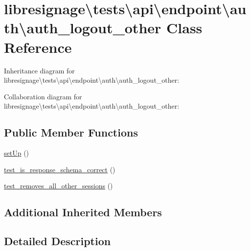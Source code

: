 \hypertarget{classlibresignage_1_1tests_1_1api_1_1endpoint_1_1auth_1_1auth__logout__other}{}\section{libresignage\textbackslash{}tests\textbackslash{}api\textbackslash{}endpoint\textbackslash{}auth\textbackslash{}auth\+\_\+logout\+\_\+other Class Reference}
\label{classlibresignage_1_1tests_1_1api_1_1endpoint_1_1auth_1_1auth__logout__other}


Inheritance diagram for libresignage\textbackslash{}tests\textbackslash{}api\textbackslash{}endpoint\textbackslash{}auth\textbackslash{}auth\+\_\+logout\+\_\+other\+:


Collaboration diagram for libresignage\textbackslash{}tests\textbackslash{}api\textbackslash{}endpoint\textbackslash{}auth\textbackslash{}auth\+\_\+logout\+\_\+other\+:
\subsection*{Public Member Functions}
\begin{DoxyCompactItemize}
\item 
\hyperlink{classlibresignage_1_1tests_1_1api_1_1endpoint_1_1auth_1_1auth__logout__other_a07c06963cac2c8037083a584097e37c8}{set\+Up} ()
\item 
\hyperlink{classlibresignage_1_1tests_1_1api_1_1endpoint_1_1auth_1_1auth__logout__other_a3cc07e685b88ab98de9a96f5e672273c}{test\+\_\+is\+\_\+response\+\_\+schema\+\_\+correct} ()
\item 
\hyperlink{classlibresignage_1_1tests_1_1api_1_1endpoint_1_1auth_1_1auth__logout__other_ae8719326784482d405b52884cc5b3a83}{test\+\_\+removes\+\_\+all\+\_\+other\+\_\+sessions} ()
\end{DoxyCompactItemize}
\subsection*{Additional Inherited Members}


\subsection{Detailed Description}


